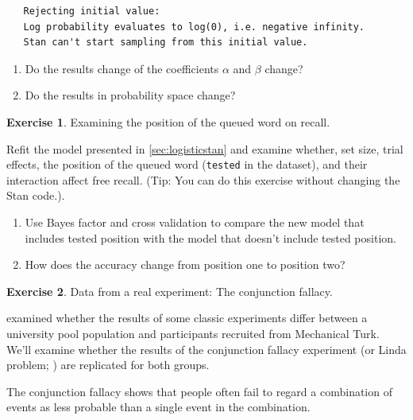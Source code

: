 \documentclass[12pt,]{krantz}
\providecommand{\tightlist}{%
  \setlength{\itemsep}{0pt}\setlength{\parskip}{0pt}}
\theoremstyle{definition}
\theoremstyle{definition}
\theoremstyle{definition}
\newtheorem{exercise}{Exercise}[chapter]
\theoremstyle{remark}
\begin{document}
\begin{verbatim}
   Rejecting initial value:
   Log probability evaluates to log(0), i.e. negative infinity.
   Stan can't start sampling from this initial value.
\end{verbatim}

\begin{enumerate}
\def\labelenumi{\alph{enumi}.}
\tightlist
\item
  Do the results change of the coefficients \(\alpha\) and \(\beta\)
  change?
\item
  Do the results in probability space change?
\end{enumerate}

\begin{exercise}
\protect\hypertarget{exr:logisticstan}{}{\label{exr:logisticstan} }Examining
the position of the queued word on recall. \end{exercise}

Refit the model presented in \ref{sec:logisticstan} and examine whether,
set size, trial effects, the position of the queued word
(\texttt{tested} in the dataset), and their interaction affect free
recall. (Tip: You can do this exercise without changing the Stan code.).

\begin{enumerate}
\def\labelenumi{\alph{enumi}.}
\tightlist
\item
  Use Bayes factor and cross validation to compare the new model that
  includes tested position with the model that doesn't include tested
  position.
\item
  How does the accuracy change from position one to position two?
\end{enumerate}

\begin{exercise}
\protect\hypertarget{exr:fallacy}{}{\label{exr:fallacy} }Data from a real
experiment: The conjunction fallacy. \end{exercise}

\citet{Paolaccietal} examined whether the results of some classic
experiments differ between a university pool population and participants
recruited from Mechanical Turk. We'll examine whether the results of the
conjunction fallacy experiment (or Linda problem;
\citet{TverskyKahneman1983}) are replicated for both groups.

The conjunction fallacy shows that people often fail to regard a
combination of events as less probable than a single event in the
combination. \citet{TverskyKahneman1983}
\end{document}
